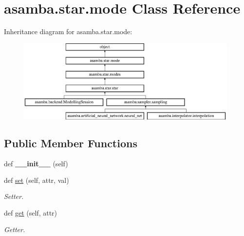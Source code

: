 \hypertarget{classasamba_1_1star_1_1mode}{}\section{asamba.\+star.\+mode Class Reference}
\label{classasamba_1_1star_1_1mode}
Inheritance diagram for asamba.\+star.\+mode\+:\begin{figure}[H]
\begin{center}
\leavevmode
\includegraphics[height=4.148148cm]{classasamba_1_1star_1_1mode}
\end{center}
\end{figure}
\subsection*{Public Member Functions}
\begin{DoxyCompactItemize}
\item 
\mbox{\label{classasamba_1_1star_1_1mode_ac9526f60e2052a0f0fc55138a76217fc}} 
def {\bfseries \+\_\+\+\_\+init\+\_\+\+\_\+} (self)
\item 
\mbox{\label{classasamba_1_1star_1_1mode_acd7157d9ec303f09579e24ba7d2638cc}} 
def \hyperlink{classasamba_1_1star_1_1mode_acd7157d9ec303f09579e24ba7d2638cc}{set} (self, attr, val)
\begin{DoxyCompactList}\small\item\em Setter. \end{DoxyCompactList}\item 
\mbox{\label{classasamba_1_1star_1_1mode_a88d1239ec655f2bc03e5db88e170aad0}} 
def \hyperlink{classasamba_1_1star_1_1mode_a88d1239ec655f2bc03e5db88e170aad0}{get} (self, attr)
\begin{DoxyCompactList}\small\item\em Getter. \end{DoxyCompactList}\end{DoxyCompactItemize}
